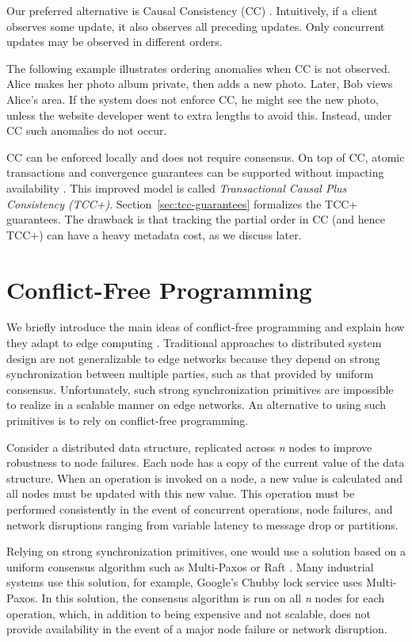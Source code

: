 Our preferred alternative is Causal Consistency (CC)
\cite{syn:rep:1738}.
Intuitively, if a client observes some update, it also observes all
preceding updates.
Only concurrent updates may be observed in different orders.

The following example illustrates ordering anomalies when CC is not
observed.
Alice makes her
photo album private, then adds a new photo. Later, Bob views Alice's
area. If the system does not enforce CC, he might see the new photo,
unless the website developer went to extra lengths to avoid this.
Instead, under CC such anomalies do not occur.

CC can be enforced locally and does not require consensus.
On top of CC, atomic transactions and convergence guarantees can be
supported without impacting availability
\cite{rep:pan:sh177,rep:pro:sh182}.
This improved model is called \emph{Transactional Causal Plus
  Consistency (TCC+)}.
Section~\ref{sec:tcc-guarantees} formalizes the TCC+ guarantees.
The drawback is that tracking the partial order in CC (and hence TCC+)
can have a heavy metadata cost, as we discuss later.

\section{Conflict-Free Programming}
\label{sec:requirements:conflict-free-programming}

We briefly introduce the main ideas of conflict-free programming and explain how they adapt to edge computing \cite{shapiro2011conflict, almeida2015efficient}. Traditional approaches to distributed system design are not generalizable to edge networks because they depend on strong synchronization between multiple parties, such as that provided by uniform consensus. Unfortunately, such strong synchronization primitives are impossible to realize in a scalable manner on edge networks. An alternative to using such primitives is to rely on conflict-free programming.

Consider a distributed data structure, replicated across \textit{n} nodes to improve robustness to node failures. Each node has a copy of the current value of the data structure. When an operation is invoked on a node, a new value is calculated and all nodes must be updated with this new value. This operation must be performed consistently in the event of concurrent operations, node failures, and network disruptions ranging from variable latency to message drop or partitions.

Relying on strong synchronization primitives, one would use a solution based on a uniform consensus algorithm such as Multi-Paxos \cite{chandra2007paxos} or Raft \cite{ongaro2014search}. Many industrial systems use this solution, for example, Google's Chubby lock service uses Multi-Paxos. In this solution, the consensus algorithm is run on all \textit{n} nodes for each operation, which, in addition to being expensive and not scalable, does not provide availability in the event of a major node failure or network disruption.

